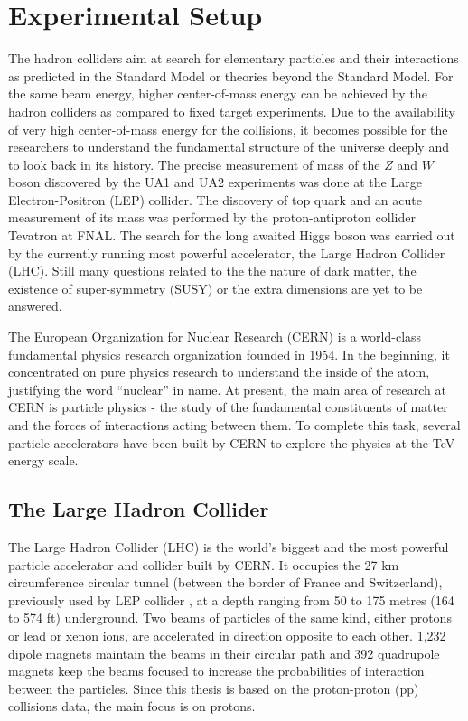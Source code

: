 \chapter{Experimental Setup}
\label{chap:Detector}
The hadron colliders aim at search for elementary particles and their interactions as predicted in the Standard Model or theories beyond the Standard Model. For the same beam energy, higher center-of-mass energy can be achieved by the hadron colliders as compared to fixed target experiments. Due to the availability of very high center-of-mass energy for the collisions, it becomes possible for the researchers to understand the fundamental structure of the universe deeply and to look back in its history. The precise measurement of mass of the $Z$ and $W$ boson discovered by the UA1 and UA2 experiments was done at the Large Electron-Positron (LEP) collider. The discovery of top quark and an acute measurement of its mass was performed by the proton-antiproton collider Tevatron at FNAL. The search for the long awaited Higgs boson was carried out by the currently running most powerful accelerator, the Large Hadron Collider (LHC). Still many questions related to the the nature of dark matter, the existence of super-symmetry (SUSY) or the extra dimensions are yet to be answered. 

The European Organization for Nuclear Research (CERN) is a world-class fundamental physics research organization founded in 1954. In the beginning, it concentrated on pure physics research to understand the inside of the atom, justifying the word ``nuclear'' in name. At present, the main area of research at CERN is particle physics - the study of the fundamental constituents of matter and the forces of interactions acting between them. To complete this task, several particle accelerators have been built by CERN to explore the physics at the TeV energy scale.

\section{The Large Hadron Collider}
The Large Hadron Collider (LHC) \cite{Evans:2008zzb} is the world's biggest and the most powerful particle accelerator and collider built by CERN. It occupies the 27 km circumference circular tunnel (between the border of France and Switzerland), previously used by LEP collider \cite{LEP}, at a depth ranging from 50 to 175 metres (164 to 574 ft) underground. Two beams of particles of the same kind, either protons or lead or xenon ions, are accelerated in direction opposite to each other. 1,232 dipole magnets maintain the beams in their circular path and 392 quadrupole magnets keep the beams focused to increase the probabilities of interaction between the particles. Since this thesis is based on the proton-proton (pp) collisions data, the main focus is on protons. 

